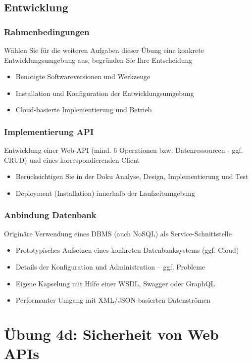 \documentclass[notitlepage, hidelinks]{article}
\begin{document}
\subsection{Entwicklung}
\subsubsection{Rahmenbedingungen}
Wählen Sie für die weiteren Aufgaben dieser Übung eine konkrete Entwicklungsumgebung aus, begründen Sie Ihre Entscheidung
\begin{itemize}
\item Benötigte Softwareversionen und Werkzeuge
\item Installation und Konfiguration der Entwicklungsumgebung
\item Cloud-basierte Implementierung und Betrieb
\end{itemize}

\subsubsection{Implementierung API}
Entwicklung einer Web-API (mind. 6 Operationen bzw. Datenressourcen - ggf. CRUD) und eines korrespondierenden Client
\begin{itemize}
\item Berücksichtigen Sie in der Doku Analyse, Design, Implementierung und Test
\item Deployment (Installation) innerhalb der Laufzeitumgebung
\end{itemize}

\subsubsection{Anbindung Datenbank}
Originäre Verwendung eines DBMS (auch NoSQL) als Service-Schnittstelle
\begin{itemize}
\item Prototypisches Aufsetzen eines konkreten Datenbanksystems (ggf. Cloud)
\item Details der Konfiguration und Administration – ggf. Probleme
\item Eigene Kapselung mit Hilfe einer WSDL, Swagger oder GraphQL
\item Performanter Umgang mit XML/JSON-basierten Datenströmen
\end{itemize}

\section{Übung 4d: Sicherheit von Web APIs}
\end{document}
